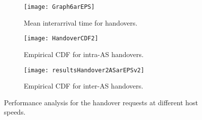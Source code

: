 \documentclass[conference]{IEEEtran}
\begin{document}
\begin{figure*}
        \centering
        \hspace{-0.1in}
        \begin{subfigure}[b]{0.3\textwidth}\centering
               \texttt{[image: Graph6arEPS]}\\
               \caption{Mean interarrival time for handovers.}
               \label{AverageHandoverDuration}
        \end{subfigure}
        \hspace{0.1in}
        \begin{subfigure}[b]{0.3\textwidth}\centering
                \texttt{[image: HandoverCDF2]}\\
                \caption{Empirical CDF for intra-AS handovers.}
                \label{HandoverDistribution}
        \end{subfigure}
        \hspace{0.1in}
        \begin{subfigure}[b]{0.3\textwidth}\centering
                \texttt{[image: resultsHandover2ASarEPSv2]}\\
                \caption{Empirical CDF for inter-AS handovers.}
                \label{HandoverDistribution2AS}
        \end{subfigure}
        \caption{Performance analysis for the handover requests at different host speeds.}\label{fig:handover_analysis}
\end{figure*}
\end{document}
